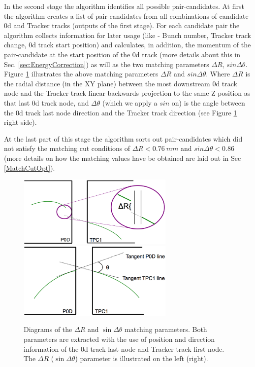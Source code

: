 In the second stage the algorithm identifies 
all possible pair-candidates. 
At first the algorithm creates a list of pair-candidates from 
all combinations of candidate \p0d and Tracker tracks 
(outputs of the first stage).
For each candidate pair the algorithm collects information for later usage 
(like - Bunch number, Tracker track change, \p0d track start position) 
and calculates, in addition, the momentum of the pair-candidate at the start 
position of the \p0d track 
(more details about this in Sec. \ref{sec:EnergyCorrection}) 
as will as the two matching parameters 
$\Delta R$, $sin\Delta\theta$. \\
Figure \ref{fig::dRsinTcalc} illustrates the above matching parameters 
$\Delta R$ and $sin\Delta\theta$. 
Where $\Delta R$ is the radial distance (in the XY plane) 
between the most downstream \p0d track node 
and the Tracker track linear backwards projection to the same Z position 
as that last \p0d track node, 
and $\Delta\theta$ (which we apply a $sin$ on) is the angle 
between the \p0d track last node direction and the Tracker track direction 
(see Figure \ref{fig::dRsinTcalc} right side).

At the last part of this stage the algorithm sorts out pair-candidates 
which did not satisfy the matching cut conditions of $\Delta R < 0.76\ mm$ 
and $sin\Delta\theta < 0.86$ 
(more details on how the matching values have be obtained are laid out 
in Sec \ref{MatchCutOpt}).
\\

\begin{figure}
\centering
\includegraphics[width=3in]{Figures/drCalc.eps}
\includegraphics[width=3in]{Figures/sindThetaCalc.eps}
\caption{
Diagrams 
of the \(\Delta R\) and \(\sin \Delta \theta\) matching parameters. 
Both parameters are extracted 
with the use of position and direction information 
of the \p0d track last node 
and Tracker track first node.
The \(\Delta R\) (\(\sin \Delta \theta\)) parameter 
is illustrated on the left (right).
}
\label{fig::dRsinTcalc}
\end{figure}

